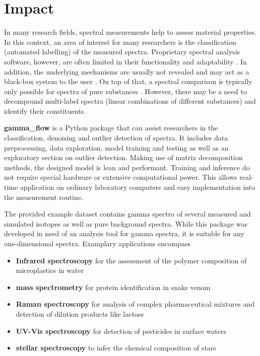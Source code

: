 \documentclass[preprint,12pt, a4paper]{elsarticle}
\begin{document}
\section{Impact}
In many research fields, spectral measurements help to assess material properties. 
In this context, an area of interest for many researchers is the classification (automated labelling) of the measured spectra. Proprietary spectral analysis software, however, are often limited in their functionality and adaptability \cite{Lam2011, Nasereddin2023}. In addition, the underlying mechanisms are usually not revealed and may act as a black-box system to the user \cite{ElAmri2022}. On top of that, a spectral comparison is typically only possible for spectra of pure substances \cite{Cowger2021}. However, there may be a need to decompound multi-label spectra (linear combinations of different substances) and identify their constituents. 

\textbf{gamma\_flow} is a Python package that can assist researchers in the classification, denoising and outlier detection of spectra. It includes data preprocessing, data exploration, model training and testing as well as an exploratory section on outlier detection. Making use of matrix decomposition methods, the designed model is lean and performant. Training and inference do not require special hardware or extensive computational power. This allows real-time application on ordinary laboratory computers and easy implementation into the measurement routine. 

The provided example dataset contains gamma spectra of several measured and simulated isotopes as well as pure background spectra. While this package was developed in need of an analysis tool for gamma spectra, it is suitable for any one-dimensional spectra. Examplary applications encompass  
\begin{itemize}
\item \textbf{Infrared spectroscopy} for the assessment of the polymer composition of 
microplastics in water \cite{Ferreiro2023, Whiting2022}  
\item \textbf{mass spectrometry} for protein identification in snake venom 
\cite{Zelanis2019, Yasemin2021}  
\item \textbf{Raman spectroscopy} for analysis of complex pharmaceutical mixtures and detection
of dilution products like lactose \cite{Fu2021}  
\item \textbf{UV-Vis spectroscopy} for detection of pesticides in surface waters \cite{Guo2020, Qi2024}
\item \textbf{stellar spectroscopy} to infer the chemical composition of stars \cite{Gray2021}  
\end{itemize}
\end{document}
